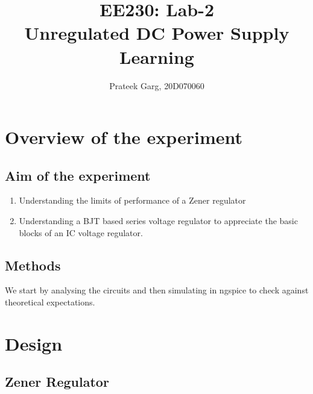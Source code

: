 \documentclass[12pt]{article}
\title{EE230: Lab-2\\
Unregulated DC Power Supply Learning}
\author{Prateek Garg, 20D070060}
\begin{document}
\noindent
\maketitle

\section{Overview of the experiment} %

\subsection{Aim of the experiment}%
\begin{enumerate}
  \item Understanding the limits of performance of a Zener regulator
  \item Understanding a BJT based series voltage regulator to appreciate the basic blocks of an IC
  voltage regulator.
\end{enumerate}
\subsection{Methods}
We start by analysing the circuits and then simulating in ngspice to check against theoretical expectations.  
\section{Design}
\subsection{Zener Regulator}
\begin{figure}[H]
  \begin{center}
\end{center}
\end{figure}
\end{document}
